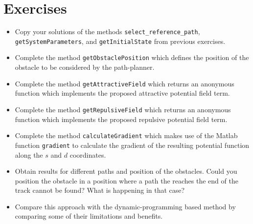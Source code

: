 \section{Exercises}
\begin{itemize}
	\item Copy your solutions of the methods \texttt{select\_reference\_path}, \texttt{getSystemParameters}, and \texttt{getInitialState} from previous exercises. 
	\item Complete the method \texttt{getObstaclePosition} which defines the position of the obstacle to be considered by the path-planner. 
	\item Complete the method \texttt{getAttractiveField} which returns an anonymous function which implements the proposed attractive potential field term. 
	\item Complete the method \texttt{getRepulsiveField} which returns an anonymous function which implements the proposed repulsive potential field term. 
	\item Complete the method \texttt{calculateGradient} which makes use of the Matlab function \texttt{gradient} to calculate the gradient of the resulting potential function along the $s$ and $d$ coordinates.
	\item Obtain results for different paths and position of the obstacles. Could you position the obstacle in a position where a path the reaches the end of the track cannot be found? What is happening in that case? 
	\item Compare this approach with the dynamic-programming based method by comparing some of their limitations and benefits. 
\end{itemize}